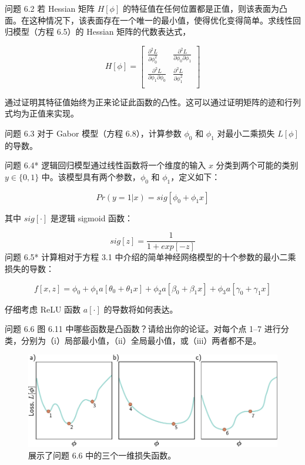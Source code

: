 \documentclass[lang=cn,newtx,10pt,scheme=chinese]{elegantbook}
\begin{document}
问题 6.2 若 Hessian 矩阵 \(H[\phi]\) 的特征值在任何位置都是正值，则该表面为凸面。在这种情况下，该表面存在一个唯一的最小值，使得优化变得简单。求线性回归模型（方程 6.5）的 Hessian 矩阵的代数表达式，

\begin{equation}
H[\phi] = \begin{bmatrix}
\frac{\partial^2 L}{\partial \phi_0^2} & \frac{\partial^2 L}{\partial \phi_0 \partial \phi_1}  \\
\frac{\partial^2 L}{\partial \phi_1 \partial \phi_0} & \frac{\partial^2 L}{\partial \phi_1^2}  \\
\end{bmatrix} 
\end{equation}

通过证明其特征值始终为正来论证此函数的凸性。这可以通过证明矩阵的迹和行列式均为正值来实现。

问题 6.3 对于 Gabor 模型（方程 6.8），计算参数 \(\phi_0\) 和 \(\phi_1\) 对最小二乘损失 \(L[\phi]\) 的导数。

问题 6.4* 逻辑回归模型通过线性函数将一个维度的输入 \(x\) 分类到两个可能的类别 \(y \in \{0,1\}\) 中。该模型具有两个参数，\(\phi_0\) 和 \(\phi_1\)，定义如下：

\begin{equation}
Pr(y = 1|x) = sig[\phi_0 + \phi_1x] 
\end{equation}

其中 \(sig[\cdot]\) 是逻辑 sigmoid 函数：

\begin{equation}
sig[z] = \frac{1}{1 + exp[-z]} 
\end{equation}
问题 6.5* 计算相对于方程 3.1 中介绍的简单神经网络模型的十个参数的最小二乘损失的导数：

\begin{equation}
f[x,z] = \phi_0 + \phi_1a[\theta_0 + \theta_1x] + \phi_2a[\beta_0 + \beta_1x] + \phi_3a[\gamma_0 + \gamma_1x] 
\end{equation}

仔细考虑 ReLU 函数 \(a[\cdot]\) 的导数将如何表达。

问题 6.6 图 6.11 中哪些函数是凸函数？请给出你的论证。对每个点 1–7 进行分类，分别为（i）局部最小值，（ii）全局最小值，或（iii）两者都不是。

\begin{figure}[ht!]
\centering
\includegraphics[width=0.7\linewidth]{PDFFigures/UDLChap6PDF/TrainConvexProb.pdf}
\caption{展示了问题 6.6 中的三个一维损失函数。}
\end{figure}
\end{document}
